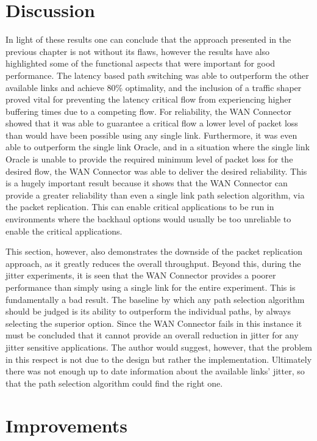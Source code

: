 \section{Discussion}

In light of these results one can conclude that the approach presented in the previous chapter is not without its flaws, however the results have also highlighted some of the functional aspects that were important for good performance. The latency based path switching was able to outperform the other available links and achieve 80\% optimality, and the inclusion of a traffic shaper proved vital for preventing the latency critical flow from experiencing higher buffering times due to a competing flow. For reliability, the WAN Connector showed that it was able to guarantee a critical flow a lower level of packet loss than would have been possible using any single link. Furthermore, it was even able to outperform the single link Oracle, and in a situation where the single link Oracle is unable to provide the required minimum level of packet loss for the desired flow, the WAN Connector was able to deliver the desired reliability. This is a hugely important result because it shows that the WAN Connector can provide a greater reliability than even a single link path selection algorithm, via the packet replication. This can enable critical applications to be run in environments where the backhaul options would usually be too unreliable to enable the critical applications.

This section, however, also demonstrates the downside of the packet replication approach, as it greatly reduces the overall throughput. Beyond this, during the jitter experiments, it is seen that the WAN Connector provides a poorer performance than simply using a single link for the entire experiment. This is fundamentally a bad result. The baseline by which any path selection algorithm should be judged is its ability to outperform the individual paths, by always selecting the superior option. Since the WAN Connector fails in this instance it must be concluded that it cannot provide an overall reduction in jitter for any jitter sensitive applications. The author would suggest, however, that the problem in this respect is not due to the design but rather the implementation. Ultimately there was not enough up to date information about the available links' jitter, so that the path selection algorithm could find the right one.


\section{Improvements}

